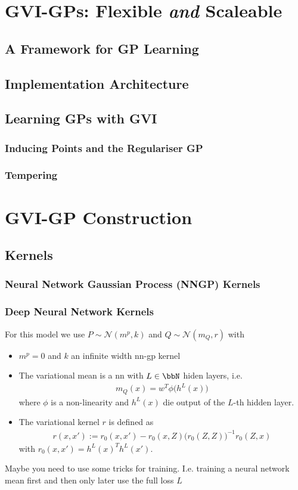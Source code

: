 \documentclass{article}
\numberwithin{equation}{section}
\begin{document}
\newpage
\section{GVI-GPs: Flexible \textit{and} Scaleable}
\subsection{A Framework for GP Learning}
\subsection{Implementation Architecture}
\subsection{Learning GPs with GVI}
\subsubsection{Inducing Points and the Regulariser GP}
\subsubsection{Tempering}


\newpage
\section{GVI-GP Construction}
\subsection{Kernels}\label{section:kernels}
\subsubsection{Neural Network Gaussian Process (NNGP) Kernels}
\subsubsection{Deep Neural Network Kernels}
For this model we use $P \sim \mathcal{N}(m^p, k) $ and $Q \sim \mathcal{N}(m_Q, r)$ with 
\begin{itemize}
    \item $m^p = 0$ and $k$ an infinite width nn-gp kernel
    \item The variational mean is a nn with $L \in \bbN$ hiden layers, i.e. 
    \begin{align}
        m_Q(x) = w^T \phi\big( h^{L}(x) \big)
    \end{align}
    where $\phi$ is a non-linearity and $h^L(x)$ die output of the $L$-th hidden layer. 
    \item 
    The variational kernel $r$ is defined as 
    \begin{align}
        r(x,x') := r_0(x,x') - r_0(x,Z) \big( r_0(Z,Z) \big)^{-1} r_0(Z,x)
    \end{align}
    with $r_0(x,x') = h^{L}(x)^T h^{L}(x')$.
\end{itemize}
Maybe you need to use some tricks for training. I.e. training a neural network mean first and then only later use the full loss $L$
\end{document}
